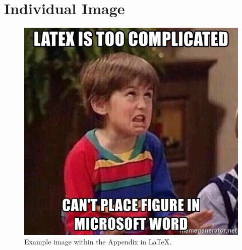 \chapter[Image]{Individual Image} \label{app:app2}
\pagestyle{myheadings}

\kant[12]  %

\begin{figure}[ht!]
  \centering
  \includegraphics[scale=0.66]{figures/latex_image_sample.jpg}
  \caption[Example Image]{Example image within the Appendix in \LaTeX.}
  \label{im:sample}
\end{figure}



